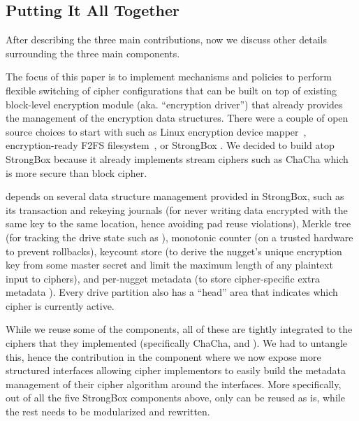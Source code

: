 \subsection{Putting It All Together}\label{subsec:des-summary}

After describing the three main contributions, now we discuss other details
surrounding the three main components.


 The focus of this paper is to implement
mechanisms and policies to perform flexible switching of cipher configurations
that can be built on top of existing block-level encryption module (aka.
``encryption driver'') that already provides the management of the encryption
data structures. There were a couple of open source choices to start with such
as Linux encryption device mapper~\cite{dmcrypt,DmC-Android}, encryption-ready
F2FS filesystem~\cite{F2FS}, or StrongBox \cite{StrongBox}. We decided to build
atop StrongBox because it already implements stream ciphers such as ChaCha which
is more secure than block cipher.

\sys depends on several data structure management provided in StrongBox, such as
its transaction and rekeying journals (for never writing data encrypted with the
same key to the same location, hence avoiding pad reuse violations), Merkle tree
(for tracking the drive state such as ), monotonic
counter (on a trusted hardware to prevent rollbacks), keycount store (to derive
the nugget's unique encryption key from some master secret and limit the maximum
length of any plaintext input to ciphers), and per-nugget metadata (to store
cipher-specific extra metadata ). Every drive partition also has a
``head'' area that indicates which cipher is currently active.

While we reuse some of the components, all of these are tightly integrated to
the ciphers that they implemented (specifically ChaCha, and \xxx). We had to
untangle this, hence the contribution in the \sysB component where we now expose
more structured interfaces allowing cipher implementors to easily build the
metadata management of their cipher algorithm around the interfaces. More
specifically, out of all the five  StrongBox components above, only
\xxx can be reused as is, while the rest needs to be modularized and rewritten.


